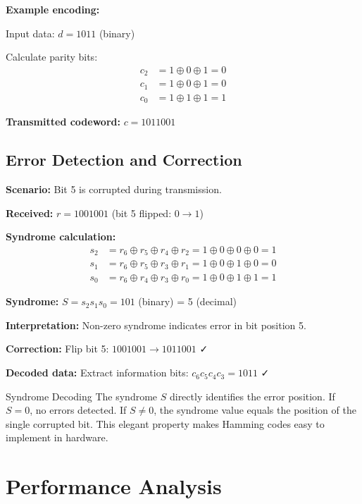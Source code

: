 \textbf{Example encoding:}

Input data: $d = 1011$ (binary)

Calculate parity bits:
\begin{align*}
c_2 &= 1 \oplus 0 \oplus 1 = 0 \\
c_1 &= 1 \oplus 0 \oplus 1 = 0 \\
c_0 &= 1 \oplus 1 \oplus 1 = 1
\end{align*}

\textbf{Transmitted codeword:} $c = 1011001$

\subsection{Error Detection and Correction}

\textbf{Scenario:} Bit 5 is corrupted during transmission.

\textbf{Received:} $r = 1001001$ (bit 5 flipped: $0 \rightarrow 1$)

\textbf{Syndrome calculation:}
\begin{align*}
s_2 &= r_6 \oplus r_5 \oplus r_4 \oplus r_2 = 1 \oplus 0 \oplus 0 \oplus 0 = 1 \\
s_1 &= r_6 \oplus r_5 \oplus r_3 \oplus r_1 = 1 \oplus 0 \oplus 1 \oplus 0 = 0 \\
s_0 &= r_6 \oplus r_4 \oplus r_3 \oplus r_0 = 1 \oplus 0 \oplus 1 \oplus 1 = 1
\end{align*}

\textbf{Syndrome:} $S = s_2 s_1 s_0 = 101$ (binary) = 5 (decimal)

\textbf{Interpretation:} Non-zero syndrome indicates error in bit position 5.

\textbf{Correction:} Flip bit 5: $1001001 \rightarrow 1011001$ ✓

\textbf{Decoded data:} Extract information bits: $c_6 c_5 c_4 c_3 = 1011$ ✓

\begin{calloutbox}{Syndrome Decoding}
The syndrome $S$ directly identifies the error position. If $S = 0$, no errors detected. If $S \neq 0$, the syndrome value equals the position of the single corrupted bit. This elegant property makes Hamming codes easy to implement in hardware.
\end{calloutbox}

\section{Performance Analysis}

